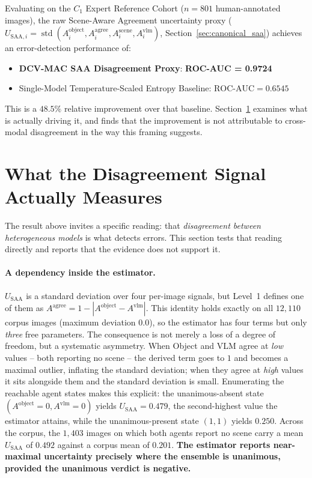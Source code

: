 \documentclass[12pt,a4paper]{report}
\begin{document}
Evaluating on the $C_1$ Expert Reference Cohort ($n=801$ human-annotated images), the raw Scene-Aware Agreement uncertainty proxy ($U_{\text{SAA},i} = \operatorname{std}(A_i^{\text{object}}, A_i^{\text{agree}}, A_i^{\text{scene}}, A_i^{\text{vlm}})$, Section~\ref{sec:canonical_saa}) achieves an error-detection performance of:
\begin{itemize}
    \item \textbf{DCV-MAC SAA Disagreement Proxy}: \textbf{ROC-AUC = 0.9724}
    \item Single-Model Temperature-Scaled Entropy Baseline: $\text{ROC-AUC} = 0.6545$
\end{itemize}
This is a $48.5\%$ relative improvement over that baseline. Section~\ref{sec:signal_decomposition} examines what is actually driving it, and finds that the improvement is not attributable to cross-modal disagreement in the way this framing suggests.

\section{What the Disagreement Signal Actually Measures}
\label{sec:signal_decomposition}
The result above invites a specific reading: that \emph{disagreement between heterogeneous models} is what detects errors. This section tests that reading directly and reports that the evidence does not support it.

\paragraph{A dependency inside the estimator.} $U_{\text{SAA}}$ is a standard deviation over four per-image signals, but Level~1 defines one of them as $A^{\text{agree}} = 1 - |A^{\text{object}} - A^{\text{vlm}}|$. This identity holds exactly on all $12{,}110$ corpus images (maximum deviation $0.0$), so the estimator has four terms but only \emph{three} free parameters. The consequence is not merely a loss of a degree of freedom, but a systematic asymmetry. When Object and VLM agree at \emph{low} values -- both reporting no scene -- the derived term goes to $1$ and becomes a maximal outlier, inflating the standard deviation; when they agree at \emph{high} values it sits alongside them and the standard deviation is small. Enumerating the reachable agent states makes this explicit: the unanimous-absent state $(A^{\text{object}}{=}0, A^{\text{vlm}}{=}0)$ yields $U_{\text{SAA}}=0.479$, the second-highest value the estimator attains, while the unanimous-present state $(1,1)$ yields $0.250$. Across the corpus, the $1{,}403$ images on which both agents report no scene carry a mean $U_{\text{SAA}}$ of $0.492$ against a corpus mean of $0.201$. \textbf{The estimator reports near-maximal uncertainty precisely where the ensemble is unanimous, provided the unanimous verdict is negative.}
\end{document}
